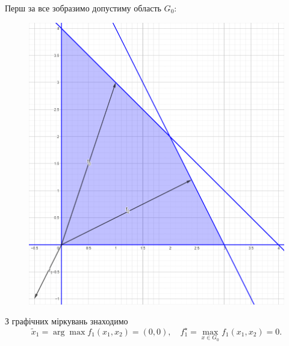 \begin{solution}
    Перш за все зобразимо допустиму область $G_0$:
    \begin{figure}[H]
        \centering
        \includegraphics[width=\textwidth]{img/successive_concessions_2_1.png}
    \end{figure}

    З графічних міркувань знаходимо \[ \tilde x_1 = \arg \max f_1(x_1, x_2) = (0, 0), \quad f_1^\star = \max_{x \in G_0} f_1(x_1, x_2) = 0. \]
    

\end{solution}

